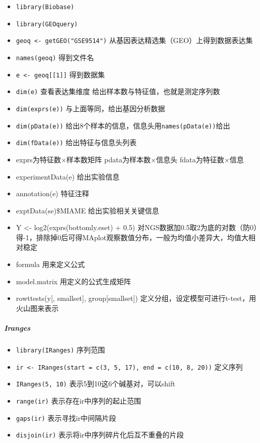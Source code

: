 \documentclass[]{book}
\providecommand{\tightlist}{%
  \setlength{\itemsep}{0pt}\setlength{\parskip}{0pt}}
\let\oldsubparagraph\subparagraph
\renewcommand{\subparagraph}[1]{\oldsubparagraph{#1}\mbox{}}
\begin{document}
\begin{itemize}
\tightlist
\item
  \texttt{library(Biobase)}
\item
  \texttt{library(GEOquery)}
\item
  \texttt{geoq\ \textless{}-\ getGEO("GSE9514")} 从基因表达精选集（GEO）上得到数据表达集
\item
  \texttt{names(geoq)} 得到文件名
\item
  \texttt{e\ \textless{}-\ geoq{[}{[}1{]}{]}} 得到数据集
\item
  \texttt{dim(e)} 查看表达集维度 给出样本数与特征值，也就是测定序列数
\item
  \texttt{dim(exprs(e))} 与上面等同，给出基因分析数据
\item
  \texttt{dim(pData(e))} 给出8个样本的信息，信息头用\texttt{names(pData(e))}给出
\item
  \texttt{dim(fData(e))} 给出特征与信息头列表
\item
  exprs为特征数×样本数矩阵 pdata为样本数×信息头 fdata为特征数×信息
\item
  experimentData(e) 给出实验信息
\item
  annotation(e) 特征注释
\item
  exptData(se)\$MIAME 给出实验相关关键信息
\item
  Y \textless{}- log2(exprs(bottomly.eset) + 0.5) 对NGS数据加0.5取2为底的对数（防0）得-1，排除掉0后可得MAplot观察数值分布，一般为均值小差异大，均值大相对稳定
\item
  formula 用来定义公式
\item
  model.matrix 用定义的公式生成矩阵
\item
  rowttests(y{[}, smallset{]}, group{[}smallset{]}) 定义分组，设定模型可进行t-test，用火山图来表示
\end{itemize}

\hypertarget{iranges}{%
\subparagraph{Iranges}\label{iranges}}

\begin{itemize}
\tightlist
\item
  \texttt{library(IRanges)} 序列范围
\item
  \texttt{ir\ \textless{}-\ IRanges(start\ =\ c(3,\ 5,\ 17),\ end\ =\ c(10,\ 8,\ 20))} 定义序列
\item
  \texttt{IRanges(5,\ 10)} 表示5到10这6个碱基对，可以shift
\item
  \texttt{range(ir)} 表示存在ir中序列的起止范围
\item
  \texttt{gaps(ir)} 表示寻找ir中间隔片段
\item
  \texttt{disjoin(ir)} 表示将ir中序列碎片化后互不重叠的片段
\end{itemize}
\end{document}
